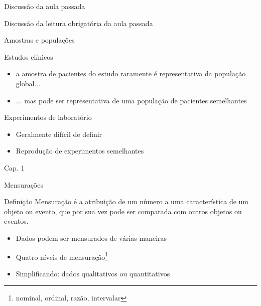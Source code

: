 \documentclass{beamer}
\begin{document}

\begin{frame}{\scriptsize Discussão da aula passada}
  \begin{block}{}
    Discussão da leitura obrigatória da aula passada
  \end{block}
\end{frame}

\begin{frame}{\scriptsize Amostras e populações}
  \begin{block}{Estudos clínicos}
    \begin{itemize}
      \footnotesize
    \item a amostra de pacientes do estudo raramente é representativa da população global...
    \item ... mas pode ser representativa de uma população de pacientes semelhantes
    \end{itemize}
  \end{block}
  \begin{block}{Experimentos de laboratório}
    \begin{itemize}
      \footnotesize
    \item Geralmente difícil de definir
    \item Reprodução de experimentos semelhantes
    \end{itemize}
  \end{block}

  \vfill
  \hfill \scriptsize Cap. 1
\end{frame}

\begin{frame}{\scriptsize Mensurações}
  \begin{block}{Definição}
      \footnotesize
    Mensuração é a atribuição de um número a uma característica de um objeto ou evento, que por sua vez pode ser comparada com outros objetos ou eventos.
  \end{block}
  \begin{itemize}
    \footnotesize
  \item Dados podem ser mensurados de várias maneiras
  \item Quatro níveis de mensuração\footnote{nominal, ordinal, razão, intervalar}
  \item Simplificando: dados \alert<2>{qualitativos} ou quantitativos
  \end{itemize}
\end{frame}
\end{document}
